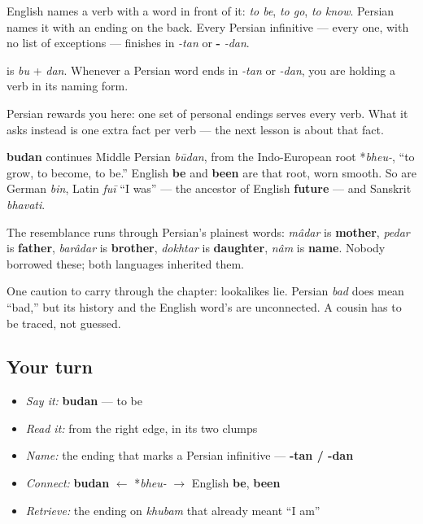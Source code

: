 \begin{grammarlens}[title={Grammar Lens: how a Persian verb announces itself}]
English names a verb with a word in front of it: \emph{to be}, \emph{to go}, \emph{to know}. Persian names it with an ending on the back. Every Persian infinitive — every one, with no list of exceptions — finishes in \emph{-tan} or \textbf{-} \emph{-dan}.

\textbf{} is \emph{bu} + \emph{dan}. Whenever a Persian word ends in \emph{-tan} or \emph{-dan}, you are holding a verb in its naming form.

Persian rewards you here: one set of personal endings serves every verb. What it asks instead is one extra fact per verb — the next lesson is about that fact.
\end{grammarlens}

\begin{cousinweb}
\textbf{budan} continues Middle Persian \emph{būdan}, from the Indo-European root *\emph{bheu-}, “to grow, to become, to be.” English \textbf{be} and \textbf{been} are that root, worn smooth. So are German \emph{bin}, Latin \emph{fuī} “I was” — the ancestor of English \textbf{future} — and Sanskrit \emph{bhavati}.

The resemblance runs through Persian's plainest words: \emph{mâdar} is \textbf{mother}, \emph{pedar} is \textbf{father}, \emph{barâdar} is \textbf{brother}, \emph{dokhtar} is \textbf{daughter}, \textbf{} \emph{nâm} is \textbf{name}. Nobody borrowed these; both languages inherited them.

One caution to carry through the chapter: lookalikes lie. Persian \textbf{} \emph{bad} does mean “bad,” but its history and the English word's are unconnected. A cousin has to be traced, not guessed.
\end{cousinweb}

\subsection*{Your turn}
\begin{itemize}
\raggedright
  \item \emph{Say it:} \textbf{budan} — to be
  \item \emph{Read it:} \textbf{} from the right edge, in its two clumps
  \item \emph{Name:} the ending that marks a Persian infinitive — \textbf{-tan / -dan}
  \item \emph{Connect:} \textbf{budan} $\leftarrow$ *\emph{bheu-} $\to$ English \textbf{be}, \textbf{been}
  \item \emph{Retrieve:} the ending on \emph{khubam} that already meant “I am”
\end{itemize}

